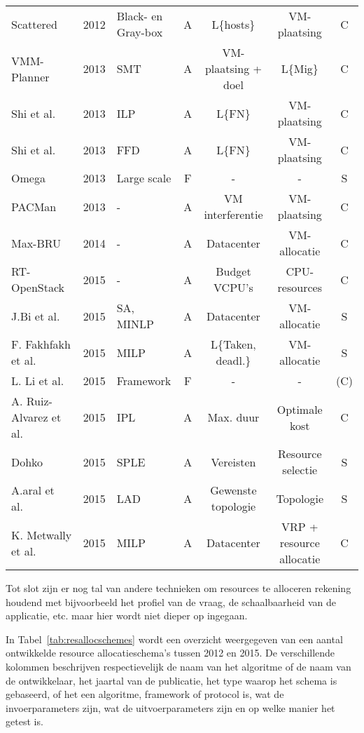 \begin{table}[tbp]
{\begin{tabular}{L{4cm} l C{2cm} c c c c}
		Scattered~\cite{Zhang2016} & 2012 & Black- en Gray-box & A & L\{hosts\} & VM-plaatsing & C \\
		VMM-Planner~\cite{Al-haj2013} & 2013 & SMT & A & VM-plaatsing + doel & L\{Mig\} & C \\
		Shi et al.~\cite{Shi2013} & 2013 & ILP & A & L\{FN\} & VM-plaatsing & C \\
		Shi et al.~\cite{Shi2013} & 2013 & FFD & A & L\{FN\} & VM-plaatsing & C \\
		Omega~\cite{Schwarzkopf2013} & 2013 & Large scale & F & - & - & S \\
		PACMan~\cite{Nath2013} & 2013 & - & A & VM interferentie & VM-plaatsing & C \\
		Max-BRU~\cite{NguyenTrungHieu2014} & 2014 & - & A & Datacenter & VM-allocatie & C \\
		RT-OpenStack~\cite{Xi2015} & 2015 & - & A & Budget VCPU's & CPU-resources & C \\
		J.Bi et al.~\cite{Bi2015} & 2015 & SA, MINLP & A & Datacenter & VM-allocatie & S \\
		F. Fakhfakh et al.~\cite{Fakhfakh2015} & 2015 & MILP & A & L\{Taken, deadl.\} & VM-allocatie & S \\
		L. Li et al.~\cite{Li2015} & 2015 & Framework & F & - & - & (C) \\
		A. Ruiz-Alvarez et al.~\cite{Ruiz-Alvarez2015} & 2015 & IPL & A & Max. duur & Optimale kost & C \\
		Dohko~\cite{Leite2015} & 2015 & SPLE & A & Vereisten & Resource selectie & S \\
		A.aral et al.~\cite{Aral2015} & 2015 & LAD & A & Gewenste topologie & Topologie & S \\
		K. Metwally et al.~\cite{Metwally2015} & 2015 & MILP & A & Datacenter & VRP + resource allocatie & C \\
		\bottomrule
	\end{tabular}}
\end{table}

Tot slot zijn er nog tal van andere technieken om resources te alloceren rekening houdend met bijvoorbeeld het profiel van de vraag, de schaalbaarheid van de applicatie, etc. maar hier wordt niet dieper op ingegaan.

In Tabel~\ref{tab:resallocschemes} wordt een overzicht weergegeven van een aantal ontwikkelde resource allocatieschema's tussen 2012 en 2015. De verschillende kolommen beschrijven respectievelijk de naam van het algoritme of de naam van de ontwikkelaar, het jaartal van de publicatie, het type waarop het schema is gebaseerd, of het een algoritme, framework of protocol is, wat de invoerparameters zijn, wat de uitvoerparameters zijn en op welke manier het getest is.